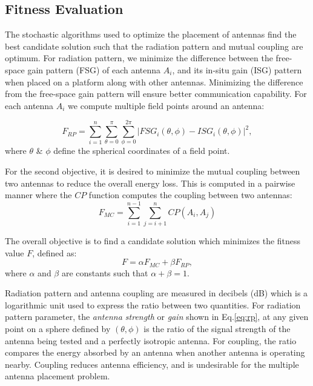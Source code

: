 \documentclass[conference]{IEEEtran}
\begin{document}
\subsection{Fitness Evaluation}
The stochastic algorithms used to optimize the placement of antennas find the best candidate solution such that the radiation pattern and mutual coupling are optimum. For radiation pattern, we minimize the difference between the free-space gain pattern (FSG) of each antenna $A_i$, and its in-situ gain (ISG) pattern when placed on a platform along with other antennas. Minimizing the difference from the free-space gain pattern will ensure better communication capability. For each antenna $A_i$ we compute multiple field points around an antenna:

\begin{equation} \label{eq:rp}
    F_{RP} = \sum_{i=1}^n\sum_{\theta=0}^\pi\sum_{\phi=0}^{2\pi}
           \left| FSG_i(\theta,\phi) - ISG_i(\theta,\phi) \right| ^2,
\end{equation}
where $\theta$ \& $\phi$ define the spherical coordinates of a field point.

For the second objective, it is desired to minimize the mutual coupling between two antennas to reduce the overall energy loss. This is computed in a pairwise manner where the $CP$ function computes the coupling between two antennas:
\begin{equation}
  F_{MC} = \sum_{i=1}^{n-1}\sum_{j=i+1}^{n} CP(A_i, A_j)
\end{equation}

The overall objective is to find a candidate solution which minimizes the fitness value $F$, defined as:
\begin{equation} \label{eq:optimal}
  F = \alpha F_{MC} + \beta F_{RP},
\end{equation}
where $\alpha$ and $\beta$ are constants such that $\alpha + \beta = 1$. 

Radiation pattern and antenna coupling are measured in decibels (dB) which is a logarithmic unit used to express the ratio between two quantities. For radiation pattern parameter, the \textit{antenna strength} or \textit{gain} shown in Eq.\eqref{eq:rp}, at any given point on a sphere defined by $(\theta, \phi)$ is the ratio of the signal strength of the antenna being tested and a perfectly isotropic antenna. For coupling, the ratio compares the energy absorbed by an antenna when another antenna is operating nearby. Coupling reduces antenna efficiency, and is undesirable for the multiple antenna placement problem.
\end{document}
